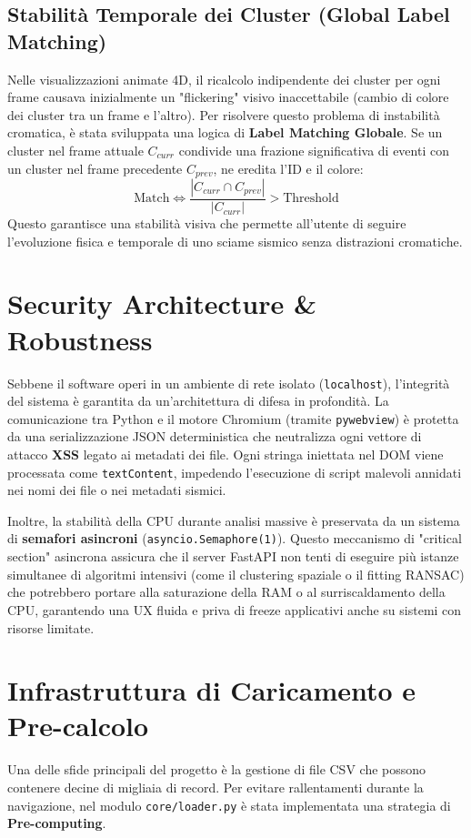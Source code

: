 \documentclass[12pt,a4paper]{article}
\begin{document}
\subsection{Stabilità Temporale dei Cluster (Global Label Matching)}
Nelle visualizzazioni animate 4D, il ricalcolo indipendente dei cluster per ogni frame causava inizialmente un "flickering" visivo inaccettabile (cambio di colore dei cluster tra un frame e l'altro). Per risolvere questo problema di instabilità cromatica, è stata sviluppata una logica di \textbf{Label Matching Globale}. Se un cluster nel frame attuale $C_{curr}$ condivide una frazione significativa di eventi con un cluster nel frame precedente $C_{prev}$, ne eredita l'ID e il colore:
\begin{equation}
    \text{Match} \iff \frac{|C_{curr} \cap C_{prev}|}{|C_{curr}|} > \text{Threshold}
\end{equation}
Questo garantisce una stabilità visiva che permette all'utente di seguire l'evoluzione fisica e temporale di uno sciame sismico senza distrazioni cromatiche.

\section{Security Architecture \& Robustness}
Sebbene il software operi in un ambiente di rete isolato (\texttt{localhost}), l'integrità del sistema è garantita da un'architettura di difesa in profondità. La comunicazione tra Python e il motore Chromium (tramite \texttt{pywebview}) è protetta da una serializzazione JSON deterministica che neutralizza ogni vettore di attacco \textbf{XSS} legato ai metadati dei file. Ogni stringa iniettata nel DOM viene processata come \texttt{textContent}, impedendo l'esecuzione di script malevoli annidati nei nomi dei file o nei metadati sismici.

Inoltre, la stabilità della CPU durante analisi massive è preservata da un sistema di \textbf{semafori asincroni} (\texttt{asyncio.Semaphore(1)}). Questo meccanismo di "critical section" asincrona assicura che il server FastAPI non tenti di eseguire più istanze simultanee di algoritmi intensivi (come il clustering spaziale o il fitting RANSAC) che potrebbero portare alla saturazione della RAM o al surriscaldamento della CPU, garantendo una UX fluida e priva di freeze applicativi anche su sistemi con risorse limitate.

\section{Infrastruttura di Caricamento e Pre-calcolo}
Una delle sfide principali del progetto è la gestione di file CSV che possono contenere decine di migliaia di record. Per evitare rallentamenti durante la navigazione, nel modulo \texttt{core/loader.py} è stata implementata una strategia di \textbf{Pre-computing}.
\end{document}
